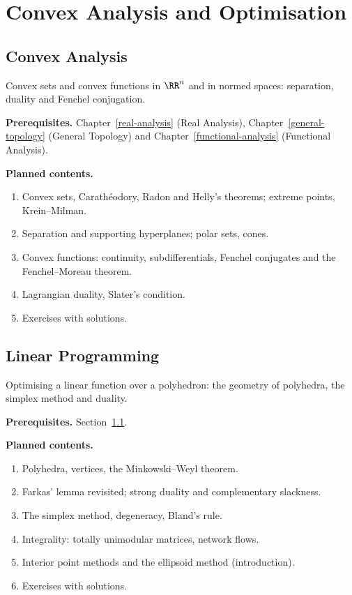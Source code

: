 \chapter{Convex Analysis and Optimisation}\label{convex-analysis}


\section{Convex Analysis}\label{convex-analysis:section-convex-analysis}
Convex sets and convex functions in $\RR^n$ and in normed spaces: separation, duality and Fenchel
conjugation.

\noindent\textbf{Prerequisites.} Chapter~\ref{real-analysis} (Real Analysis), Chapter~\ref{general-topology} (General Topology) and Chapter~\ref{functional-analysis} (Functional Analysis).

\noindent\textbf{Planned contents.}
\begin{enumerate}
\item Convex sets, Carath\'eodory, Radon and Helly's theorems; extreme points, Krein--Milman.
\item Separation and supporting hyperplanes; polar sets, cones.
\item Convex functions: continuity, subdifferentials, Fenchel conjugates and the Fenchel--Moreau theorem.
\item Lagrangian duality, Slater's condition.
\item Exercises with solutions.
\end{enumerate}

\section{Linear Programming}\label{convex-analysis:section-linear-programming}
Optimising a linear function over a polyhedron: the geometry of polyhedra, the simplex method and
duality.

\noindent\textbf{Prerequisites.} Section~\ref{convex-analysis:section-convex-analysis}.

\noindent\textbf{Planned contents.}
\begin{enumerate}
\item Polyhedra, vertices, the Minkowski--Weyl theorem.
\item Farkas' lemma revisited; strong duality and complementary slackness.
\item The simplex method, degeneracy, Bland's rule.
\item Integrality: totally unimodular matrices, network flows.
\item Interior point methods and the ellipsoid method (introduction).
\item Exercises with solutions.
\end{enumerate}


